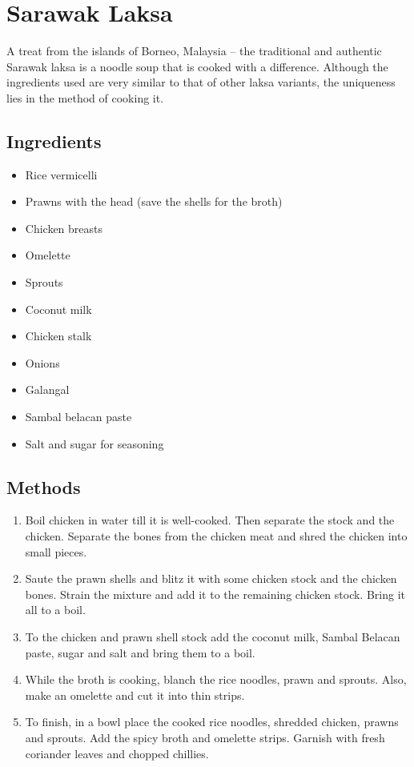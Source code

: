 \section{Sarawak Laksa}
A treat from the islands of Borneo, Malaysia – the traditional and authentic Sarawak laksa is a noodle soup that is cooked with a difference. Although the ingredients used are very similar to that of other laksa variants, the uniqueness lies in the method of cooking it.

\subsection{Ingredients}
\begin{itemize}
	\item Rice vermicelli
	\item Prawns with the head (save the shells for the broth)
	\item Chicken breasts
	\item Omelette
	\item Sprouts
	\item Coconut milk
	\item Chicken stalk
	\item Onions
	\item Galangal
	\item Sambal belacan paste
	\item Salt and sugar for seasoning
\end{itemize}

\subsection{Methods}
\begin{enumerate}
\item Boil chicken in water till it is well-cooked. Then separate the stock and the chicken. Separate the bones from the chicken meat and shred the chicken into small pieces.
\item Saute the prawn shells and blitz it with some chicken stock and the chicken bones. Strain the mixture and add it to the remaining chicken stock. Bring it all to a boil.
\item To the chicken and prawn shell stock add the coconut milk, Sambal Belacan paste, sugar and salt and bring them to a boil.
\item While the broth is cooking, blanch the rice noodles, prawn and sprouts. Also, make an omelette and cut it into thin strips.
\item To finish, in a bowl place the cooked rice noodles, shredded chicken, prawns and sprouts. Add the spicy broth and omelette strips. Garnish with fresh coriander leaves and chopped chillies.
\end{enumerate}

